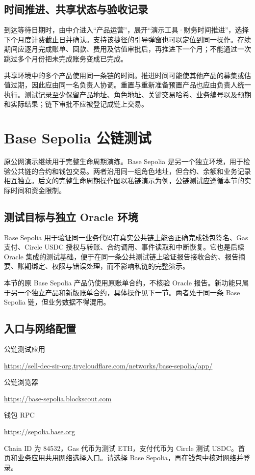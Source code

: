 \documentclass[12pt,a4paper]{article}
\begin{document}
\subsection{时间推进、共享状态与验收记录}
到达等待日期时，由中介进入“产品运营”，展开“演示工具·财务时间推进”，选择下个月度计费截止日并确认。支持该捷径的引导弹窗也可以定位到同一操作。存续期间应逐月完成账单、回款、费用及估值审批后，再推进下一个月；不能通过一次跳过多个月份把未完成账务变成已完成。

共享环境中的多个产品使用同一条链的时间。推进时间可能使其他产品的募集或估值过期，因此应由同一名负责人协调。重置与重新准备预置产品也应由负责人统一执行。测试记录至少保留产品地址、角色地址、关键交易哈希、业务编号以及预期和实际结果；链下审批不应被登记成链上交易。

\clearpage\section{Base Sepolia 公链测试}
原公网演示继续用于完整生命周期演练。Base Sepolia 是另一个独立环境，用于检验公共链的合约和钱包交易。两者沿用同一组角色地址，但合约、余额和业务记录相互独立。后文的完整生命周期操作图以私链演示为例，公链测试应遵循本节的实际时间和资金限制。

\subsection{测试目标与独立 Oracle 环境}
Base Sepolia 用于验证同一业务代码在真实公共链上能否正确完成钱包签名、Gas 支付、Circle USDC 授权与转账、合约调用、事件读取和中断恢复。它也是后续 Oracle 集成的测试基础，便于在同一条公共测试链上验证报告接收合约、报告摘要、账期绑定、权限与错误处理，而不影响私链的完整演示。

本节的原 Base Sepolia 产品仍使用原账单合约，不核验 Oracle 报告。新功能只属于另一个独立产品和新版账单合约，具体操作见下一节。两者处于同一条 Base Sepolia 链，但业务数据不得混用。

\subsection{入口与网络配置}
公链测试应用\par\url{https://sell-dec-sir-org.trycloudflare.com/networks/base-sepolia/app/}\par
公链浏览器\par\url{https://base-sepolia.blockscout.com}\par
钱包 RPC\par\url{https://sepolia.base.org}\par
Chain ID 为 84532，Gas 代币为测试 ETH，支付代币为 Circle 测试 USDC。首页和业务应用共用网络选择入口。请选择 Base Sepolia，再在钱包中核对网络并登录。
\end{document}
